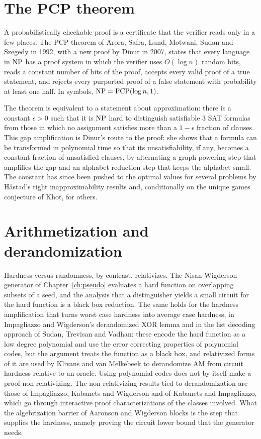 \section{The PCP theorem}

A probabilistically checkable proof is a certificate that the verifier reads only in a few places. The PCP theorem of Arora, Safra, Lund, Motwani, Sudan and Szegedy in 1992, with a new proof by Dinur in 2007, states that every language in $\mathrm{NP}$ has a proof system in which the verifier uses $O(\log n)$ random bits, reads a constant number of bits of the proof, accepts every valid proof of a true statement, and rejects every purported proof of a false statement with probability at least one half. In symbols, $\mathrm{NP} = \mathrm{PCP}(\log n, 1)$.

The theorem is equivalent to a statement about approximation: there is a constant $\epsilon > 0$ such that it is $\mathrm{NP}$ hard to distinguish satisfiable $3$ SAT formulas from those in which no assignment satisfies more than a $1 - \epsilon$ fraction of clauses. This gap amplification is Dinur's route to the proof: she shows that a formula can be transformed in polynomial time so that its unsatisfiability, if any, becomes a constant fraction of unsatisfied clauses, by alternating a graph powering step that amplifies the gap and an alphabet reduction step that keeps the alphabet small. The constant has since been pushed to the optimal values for several problems by H{\aa}stad's tight inapproximability results and, conditionally on the unique games conjecture of Khot, for others.

\section{Arithmetization and derandomization}

Hardness versus randomness, by contrast, relativizes. The Nisan Wigderson generator of Chapter~\ref{ch:pseudo} evaluates a hard function on overlapping subsets of a seed, and the analysis that a distinguisher yields a small circuit for the hard function is a black box reduction. The same holds for the hardness amplification that turns worst case hardness into average case hardness, in Impagliazzo and Wigderson's derandomized XOR lemma and in the list decoding approach of Sudan, Trevisan and Vadhan: these encode the hard function as a low degree polynomial and use the error correcting properties of polynomial codes, but the argument treats the function as a black box, and relativized forms of it are used by Klivans and van Melkebeek to derandomize AM from circuit hardness relative to an oracle. Using polynomial codes does not by itself make a proof non relativizing. The non relativizing results tied to derandomization are those of Impagliazzo, Kabanets and Wigderson and of Kabanets and Impagliazzo, which go through interactive proof characterizations of the classes involved. What the algebrization barrier of Aaronson and Wigderson blocks is the step that supplies the hardness, namely proving the circuit lower bound that the generator needs.

